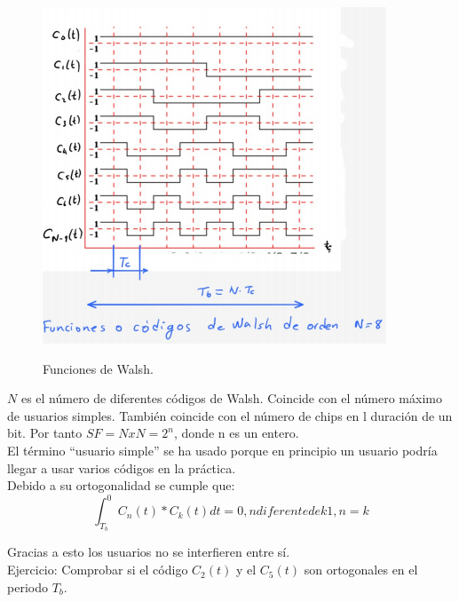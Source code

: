 \begin{figure}[h!]
	\captionsetup{justification = raggedright, singlelinecheck = false}
	\caption{Funciones de Walsh.} 
	\centering
	\includegraphics[scale=1]{Imagenes/Funciones-codigo.png}
	\label{fig:Funciones-codigo}
\end{figure}

$N$ es el número de diferentes códigos de Walsh. Coincide con el número máximo de usuarios simples. También coincide con el número de chips en l duración de un bit. Por tanto           $SF=N x N= 2^{n}$, donde n es un entero.\\

El término “usuario simple” se ha usado porque en principio un usuario podría llegar a usar varios códigos en la práctica. \\

Debido a su ortogonalidad se cumple que: \\

\begin{equation} \label{capseis_seis}
\int_{T_{b}}^0 C_{n}(t)*C_{k}(t)dt={0, n diferente de k 1, n=k}
\end{equation}

Gracias a esto los usuarios no se interfieren entre sí. \\

Ejercicio: Comprobar si el código $C_{2}(t)$ y el $C_{5}(t)$ son ortogonales en el periodo $T_{b}$.

